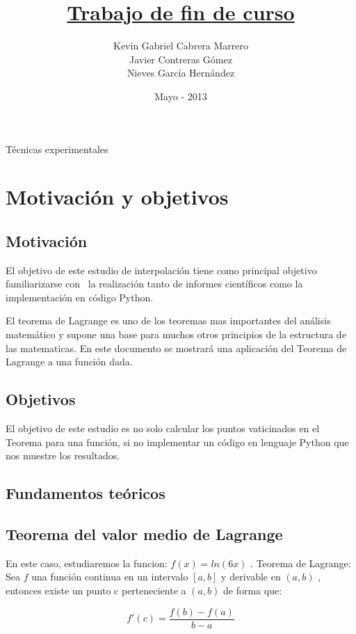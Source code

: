 \documentclass{beamer}
\title{\underline{Trabajo de fin de curso}}
\author{ Kevin Gabriel Cabrera Marrero\\Javier Contreras Gómez\\Nieves García Hernández}
\date{Mayo - 2013}
\begin{document}
\begin{frame}


  
\titlepage


\begin{center}
Técnicas experimentales
\end{center}
\end{frame}


\section{Motivación y objetivos}
\subsection{Motivación}
\begin{frame}
    El objetivo de este estudio de interpolación tiene como principal objetivo familiarizarse con \ 
    la realización tanto de informes científicos como la implementación en código Python.\
  \end{frame}
\begin{frame}
    El teorema de Lagrange es uno de los teoremas mas importantes del análisis matemático y 
    supone una base para muchos otros principios de la estructura de las matematicas.
    \smallskip
    En este documento se mostrará una aplicación del Teorema de Lagrange a una función dada.
\end{frame}
 \subsection{Objetivos}
\begin{frame}
    El objetivo de este estudio es no solo calcular los puntos vaticinados en el Teorema para una 
    función, si no implementar un código en lenguaje Python que nos muestre los resultados.
\end{frame}
\begin{frame}
\section{Fundamentos teóricos}
 \subsection{Teorema del valor medio de Lagrange}
  En este caso, estudiaremos la funcion: $ f(x)= ln(6x) $ .
  Teorema de Lagrange:
  Sea $ f $ una función continua en un intervalo  $ [a,b] $ y derivable en $ (a,b) $ ,
  entonces existe un punto c perteneciente a $ (a,b) $ de forma que:
  
   \[ f'(c)= \frac{f (b)-f (a)}{b-a} \]
\end{frame}
      
\end{document}
